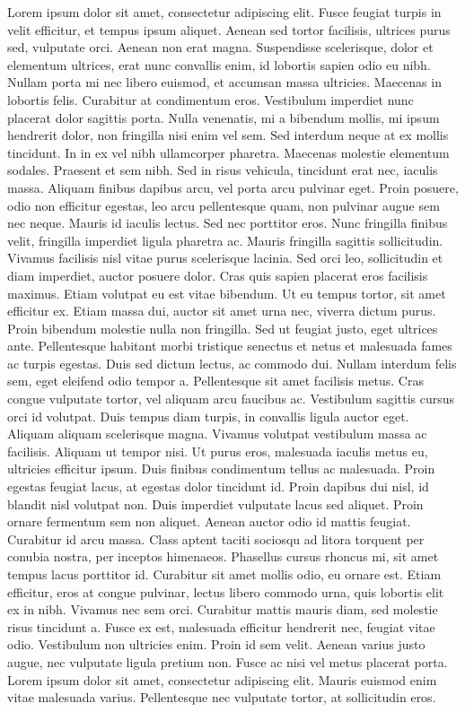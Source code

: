 \documentclass[twoside,a4paper]{article}
\begin{document}
\begin{double}
Lorem ipsum dolor sit amet, consectetur adipiscing elit. Fusce feugiat turpis in velit efficitur, et tempus ipsum aliquet. Aenean sed tortor facilisis, ultrices purus sed, vulputate orci. Aenean non erat magna. Suspendisse scelerisque, dolor et elementum ultrices, erat nunc convallis enim, id lobortis sapien odio eu nibh. Nullam porta mi nec libero euismod, et accumsan massa ultricies. Maecenas in lobortis felis. Curabitur at condimentum eros. Vestibulum imperdiet nunc placerat dolor sagittis porta. Nulla venenatis, mi a bibendum mollis, mi ipsum hendrerit dolor, non fringilla nisi enim vel sem. Sed interdum neque at ex mollis tincidunt. In in ex vel nibh ullamcorper pharetra. Maecenas molestie elementum sodales. Praesent et sem nibh. Sed in risus vehicula, tincidunt erat nec, iaculis massa. Aliquam finibus dapibus arcu, vel porta arcu pulvinar eget. Proin posuere, odio non efficitur egestas, leo arcu pellentesque quam, non pulvinar augue sem nec neque.
Mauris id iaculis lectus. Sed nec porttitor eros. Nunc fringilla finibus velit, fringilla imperdiet ligula pharetra ac. Mauris fringilla sagittis sollicitudin. Vivamus facilisis nisl vitae purus scelerisque lacinia. Sed orci leo, sollicitudin et diam imperdiet, auctor posuere dolor. Cras quis sapien placerat eros facilisis maximus. Etiam volutpat eu est vitae bibendum. Ut eu tempus tortor, sit amet efficitur ex. Etiam massa dui, auctor sit amet urna nec, viverra dictum purus. Proin bibendum molestie nulla non fringilla. Sed ut feugiat justo, eget ultrices ante. Pellentesque habitant morbi tristique senectus et netus et malesuada fames ac turpis egestas.
Duis sed dictum lectus, ac commodo dui. Nullam interdum felis sem, eget eleifend odio tempor a. Pellentesque sit amet facilisis metus. Cras congue vulputate tortor, vel aliquam arcu faucibus ac. Vestibulum sagittis cursus orci id volutpat. Duis tempus diam turpis, in convallis ligula auctor eget. Aliquam aliquam scelerisque magna. Vivamus volutpat vestibulum massa ac facilisis. Aliquam ut tempor nisi. Ut purus eros, malesuada iaculis metus eu, ultricies efficitur ipsum. Duis finibus condimentum tellus ac malesuada.
Proin egestas feugiat lacus, at egestas dolor tincidunt id. Proin dapibus dui nisl, id blandit nisl volutpat non. Duis imperdiet vulputate lacus sed aliquet. Proin ornare fermentum sem non aliquet. Aenean auctor odio id mattis feugiat. Curabitur id arcu massa. Class aptent taciti sociosqu ad litora torquent per conubia nostra, per inceptos himenaeos. Phasellus cursus rhoncus mi, sit amet tempus lacus porttitor id. Curabitur sit amet mollis odio, eu ornare est. Etiam efficitur, eros at congue pulvinar, lectus libero commodo urna, quis lobortis elit ex in nibh. Vivamus nec sem orci.
Curabitur mattis mauris diam, sed molestie risus tincidunt a. Fusce ex est, malesuada efficitur hendrerit nec, feugiat vitae odio. Vestibulum non ultricies enim. Proin id sem velit. Aenean varius justo augue, nec vulputate ligula pretium non. Fusce ac nisi vel metus placerat porta. Lorem ipsum dolor sit amet, consectetur adipiscing elit. Mauris euismod enim vitae malesuada varius. Pellentesque nec vulputate tortor, at sollicitudin eros.
\end{double}
\end{document}
